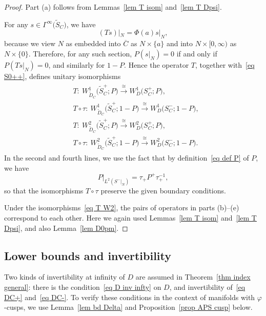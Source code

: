 \documentclass[10pt,a4paper]{amsart}
\numberwithin{equation}{section}
\begin{document}
\begin{proof}
Part (a) follows from Lemmas~\ref{lem T isom} and~\ref{lem T Dpsi}.

For any $s \in \Gamma^{\infty}\big(\widetilde{S}_C\big)$, we have
\[
(Ts)|_N = \Phi(a) s|_N,
\]
because we view $N$ as embedded into $\overline{C}$ as $N\times \{a\}$ and into $N \times [0,\infty)$ as $N \times \{0\}$. Therefore, for any such section, $P(s|_N) = 0$ if and only if $P (Ts|_N) = 0$, and similarly for $1-P$. Hence the operator $T$, together with~\eqref{eq S0++}, defines unitary isomorphisms
\begin{align}\label{eq T W2}
\begin{split}
&T\colon\ W^1_{\widetilde{D}_C}\big(\widetilde{S}_C^+; P\big) \xrightarrow{\cong} W^1_{D}\big(S_C^+; P\big), \\
&T \circ \tau \colon\ W^1_{\widetilde{D}_C}\big(\widetilde{S}_C^+;1- P\big) \xrightarrow{\cong}W^1_{D}\big(S_C^-;1- P\big), \\
&T\colon\ W^2_{\widetilde{D}_C}\big(\widetilde{S}_C^+; P\big) \xrightarrow{\cong}W^2_{D}\big(S_C^+; P\big),\\
&T\circ \tau \colon\ W^2_{\widetilde{D}_C}\big(\widetilde{S}_C^+; 1-P\big) \xrightarrow{\cong}W^2_{D}\big(S_C^-; 1-P\big).
\end{split}
\end{align}
In the second and fourth lines, we use the fact that by definition~\eqref{eq def P} of $P$, we have
\[
P|_{L^2(S^-|_N)} = \tau_+ P^+ \tau_+^{-1},
\]
so that the isomorphisms $T \circ \tau$ preserve the given boundary conditions.

Under the isomorphisms~\eqref{eq T W2}, the pairs of operators in parts (b)--(e) correspond to each other. Here we again used Lemmas~\ref{lem T isom} and~\ref{lem T Dpsi}, and also Lemma~\ref{lem D0pm}.
\end{proof}

\subsection{Lower bounds and invertibility}%

Two kinds of invertibility at infinity of $D$ are assumed in Theorem~\ref{thm index general}: there is the condition~\eqref{eq D inv infty} on $D$, and invertibility of~\eqref{eq DC+} and~\eqref{eq DC-}. To verify these conditions in the context of manifolds with $\varphi$-cusps, we use Lemma~\ref{lem bd Delta} and Proposition~\ref{prop APS cusp} below.
\end{document}
